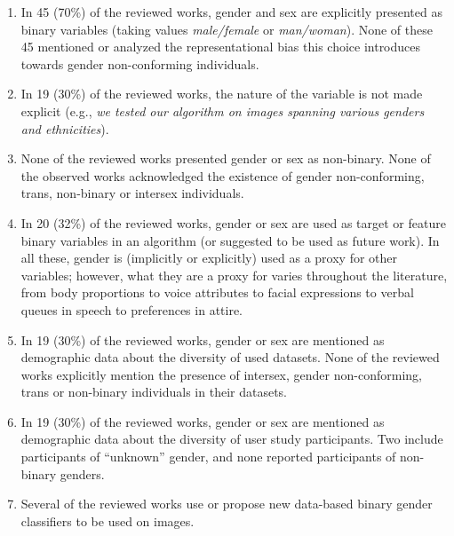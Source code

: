 \documentclass[nonacm,sigconf,review,balance=false]{acmart}
\begin{document}
\begin{enumerate}[O1.]
    \item In 45 (70\%) of the reviewed works, gender and sex are explicitly presented as binary variables (taking values \emph{male/female} or \emph{man/woman}). None of these 45 mentioned or analyzed the representational bias this choice introduces towards gender non-conforming individuals.
    \item In 19 (30\%) of the reviewed works, the nature of the variable is not made explicit (e.g., \emph{we tested our algorithm on images spanning various genders and ethnicities}).
    \item None of the reviewed works presented gender or sex as non-binary. None of the observed works acknowledged the existence of gender non-conforming, trans, non-binary or intersex individuals.
    \item In 20 (32\%) of the reviewed works, gender or sex are used as target or feature binary variables in an algorithm (or suggested to be used as future work). In all these, gender is (implicitly or explicitly) used as a proxy for other variables; however, what they are a proxy for varies throughout the literature, from body proportions to voice attributes to facial expressions to verbal queues in speech to preferences in attire.
    \item In 19 (30\%) of the reviewed works, gender or sex are mentioned as demographic data about the diversity of used datasets. None of the reviewed works explicitly mention the presence of intersex, gender non-conforming, trans or non-binary individuals in their datasets.
    \item In 19 (30\%) of the reviewed works, gender or sex are mentioned as demographic data about the diversity of user study participants. Two include participants of ``unknown'' gender, and none reported participants of non-binary genders.
    \item Several of the reviewed works use or propose new data-based binary gender classifiers to be used on images.
\end{enumerate}
\end{document}

